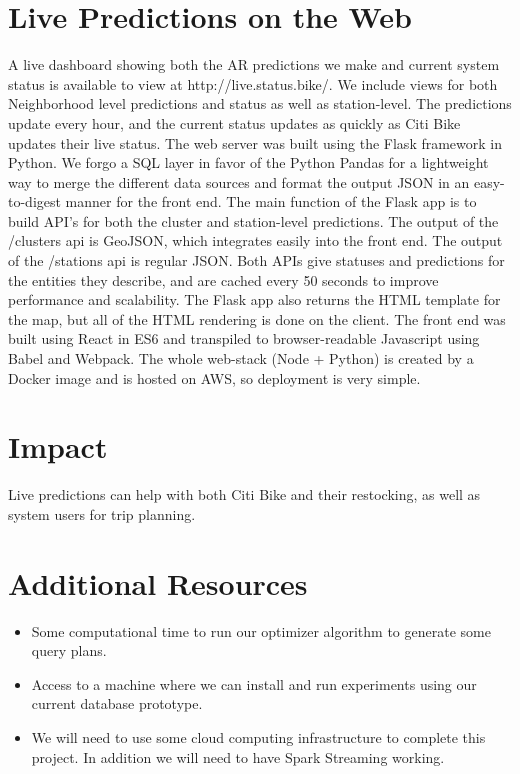 \documentclass{proc}
\begin{document}
\section{Live Predictions on the Web}
A live dashboard showing both the AR predictions we make and current system status is available to view at http://live.status.bike/. We include views for both Neighborhood level predictions and status as well as station-level. The predictions update every hour, and the current status updates as quickly as Citi Bike updates their live status. The web server was built using the Flask framework in Python. We forgo a SQL layer in favor of the Python Pandas for a lightweight way to merge the different data sources and format the output JSON in an easy-to-digest manner for the front end. The main function of the Flask app is to build API's for both the cluster and station-level predictions. The output of the /clusters api is GeoJSON, which integrates easily into the front end. The output of the /stations api is regular JSON. Both APIs give statuses and predictions for the entities they describe, and are cached every 50 seconds to improve performance and scalability. The Flask app also returns the HTML template for the map, but all of the HTML rendering is done on the client. The front end was built using React in ES6 and transpiled to browser-readable Javascript using Babel and Webpack. The whole web-stack (Node + Python) is created by a Docker image and is hosted on AWS, so deployment is very simple.

\section{Impact}
Live predictions can help with both Citi Bike and their restocking, as well as system users for trip planning.


\section{Additional Resources}

\begin{itemize}
  \item Some computational time to run our optimizer algorithm to generate some query plans.
  \item Access to a machine where we can install and run experiments using our current database prototype.
  \item We will need to use some cloud computing infrastructure to complete this project. In addition we will need to have Spark Streaming working.
 \end{itemize}
 
\end{document}
